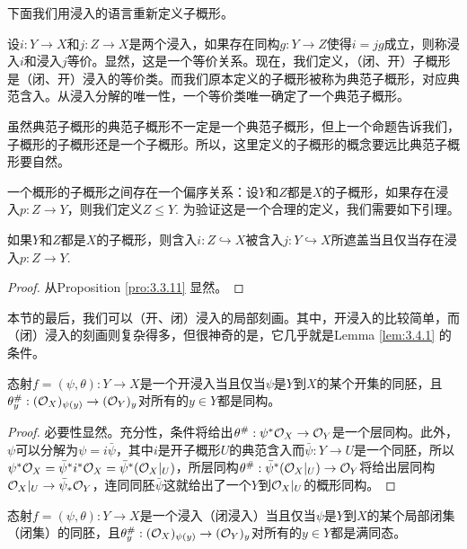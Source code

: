 下面我们用浸入的语言重新定义子概形。

\begin{para}[子概形]
	设$i:Y\to X$和$j:Z\to X$是两个浸入，如果存在同构$g:Y\to Z$使得$i=jg$成立，则称浸入$i$和浸入$j$等价。显然，这是一个等价关系。现在，我们定义，（闭、开）子概形是（闭、开）浸入的等价类。而我们原本定义的子概形被称为典范子概形，对应典范含入。从浸入分解的唯一性，一个等价类唯一确定了一个典范子概形。

	虽然典范子概形的典范子概形不一定是一个典范子概形，但上一个命题告诉我们，子概形的子概形还是一个子概形。所以，这里定义的子概形的概念要远比典范子概形要自然。
\end{para}

\begin{para}[子概形的偏序关系]
	一个概形的子概形之间存在一个偏序关系：设$Y$和$Z$都是$X$的子概形，如果存在浸入$p:Z\to Y$，则我们定义$Z\leq Y$. 为验证这是一个合理的定义，我们需要如下引理。
\end{para}

\begin{lem}
如果$Y$和$Z$都是$X$的子概形，则含入$i:Z\hookrightarrow X$被含入$j:Y\hookrightarrow X$所遮盖当且仅当存在浸入$p:Z\to Y$.
\end{lem}

\begin{proof}
从Proposition \ref{pro:3.3.11} 显然。
\end{proof}

本节的最后，我们可以（开、闭）浸入的局部刻画。其中，开浸入的比较简单，而（闭）浸入的刻画则复杂得多，但很神奇的是，它几乎就是Lemma \ref{lem:3.4.1} 的条件。

\begin{pro}
态射$f=(\psi,\theta):Y\to X$是一个开浸入当且仅当$\psi$是$Y$到$X$的某个开集的同胚，且$\theta^\#_y:(\mathcal{O}_X)_{\psi(y)}\to (\mathcal{O}_Y)_y$对所有的$y\in Y$都是同构。
\end{pro}

\begin{proof}
必要性显然。充分性，条件将给出$\theta^\#:\psi^*\mathcal{O}_X\to \mathcal{O}_Y$是一个层同构。此外，$\psi$可以分解为$\psi=i\bar\psi$，其中$i$是开子概形$U$的典范含入而$\bar\psi:Y\to U$是一个同胚，所以$\psi^*\mathcal{O}_X=\bar\psi^* i^*\mathcal{O}_X=\bar\psi^*(\mathcal{O}_X|_U)$，所层同构$\theta^\#:\bar\psi^*(\mathcal{O}_X|_U)\to \mathcal{O}_Y$将给出层同构$\mathcal{O}_X|_U\to \bar\psi_*\mathcal{O}_Y$，连同同胚$\bar\psi$这就给出了一个$Y$到$\mathcal{O}_X|_U$的概形同构。
\end{proof}

\begin{pro}\label{pro:3.4.11}
态射$f=(\psi,\theta):Y\to X$是一个浸入（闭浸入）当且仅当$\psi$是$Y$到$X$的某个局部闭集（闭集）的同胚，且$\theta^\#_y:(\mathcal{O}_X)_{\psi(y)}\to (\mathcal{O}_Y)_y$对所有的$y\in Y$都是满同态。
\end{pro}

